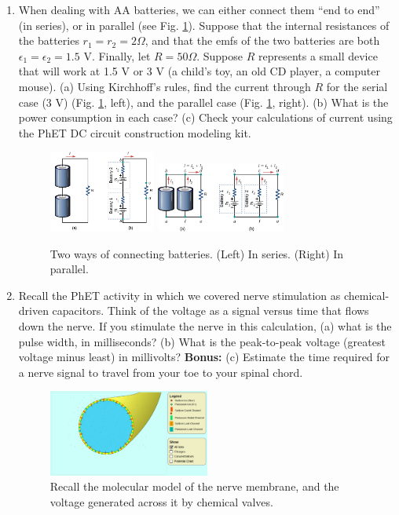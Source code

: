 \documentclass[10pt]{article}
\begin{document}
\begin{enumerate}

\item When dealing with AA batteries, we can either connect them ``end to end'' (in series), or in parallel (see Fig. \ref{fig:ohm1}).  Suppose that the internal resistances of the batteries $r_1 = r_2 = 2 \Omega$, and that the emfs of the two batteries are both $\epsilon_1 = \epsilon_2 = 1.5$ V.  Finally, let $R = 50 \Omega$.  Suppose $R$ represents a small device that will work at 1.5 V or 3 V (a child's toy, an old CD player, a computer mouse).  (a) Using Kirchhoff's rules, find the current through $R$ for the serial case (3 V) (Fig. \ref{fig:ohm1}, left), and the parallel case (Fig. \ref{fig:ohm1}, right).  (b) What is the power consumption in each case?  (c) Check your calculations of current using the PhET DC circuit construction modeling kit.

\begin{figure}[hb]
\centering
\includegraphics[width=0.33\textwidth]{figures/ohm2.png} \hspace{1cm}
\includegraphics[width=0.4\textwidth]{figures/battery2.jpeg}
\caption{\label{fig:ohm1} Two ways of connecting batteries.  (Left) In series. (Right) In parallel.}
\end{figure}

\vspace{5cm}

\item Recall the PhET activity in which we covered nerve stimulation as chemical-driven capacitors.  Think of the voltage as a signal versus time that flows down the nerve.  If you stimulate the nerve in this calculation, (a) what is the pulse width, in milliseconds?  (b) What is the peak-to-peak voltage (greatest voltage minus least) in millivolts? \textbf{Bonus:} (c) Estimate the time required for a nerve signal to travel from your toe to your spinal chord.

\begin{figure}[hb]
\centering
\includegraphics[width=0.5\textwidth]{figures/neuron.png}
\caption{\label{fig:neuron} Recall the molecular model of the nerve membrane, and the voltage generated across it by chemical valves.}
\end{figure}

\end{enumerate}
\end{document}

